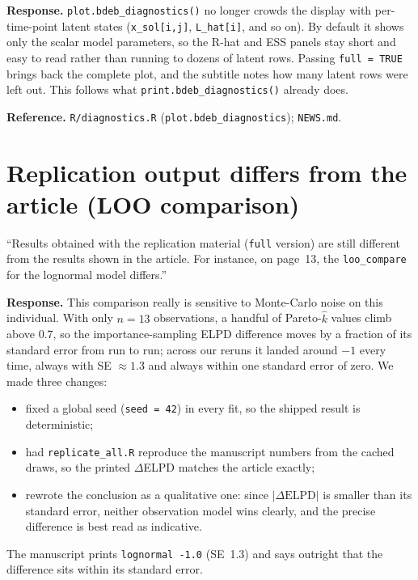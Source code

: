 \documentclass[11pt,a4paper]{article}
\newcommand{\code}[1]{\texttt{#1}}
\begin{document}
\textbf{Response.} \code{plot.bdeb\_diagnostics()} no longer crowds the
display with per-time-point latent states (\code{x\_sol[i,j]},
\code{L\_hat[i]}, and so on). By default it shows only the scalar model
parameters, so the R-hat and ESS panels stay short and easy to read
rather than running to dozens of latent rows. Passing \code{full = TRUE}
brings back the complete plot, and the subtitle notes how many latent
rows were left out. This follows what \code{print.bdeb\_diagnostics()}
already does.

\textbf{Reference.} \code{R/diagnostics.R}
(\code{plot.bdeb\_diagnostics}); \code{NEWS.md}.

\section{Replication output differs from the article (LOO comparison)}

\begin{displayquote}
``Results obtained with the replication material (\code{full} version)
are still different from the results shown in the article. For instance,
on page~13, the \code{loo\_compare} for the lognormal model differs.''
\end{displayquote}

\textbf{Response.} This comparison really is sensitive to Monte-Carlo
noise on this individual. With only $n = 13$ observations, a handful of
Pareto-$\hat{k}$ values climb above $0.7$, so the importance-sampling
ELPD difference moves by a fraction of its standard error from run to
run; across our reruns it landed around $-1$ every time, always with SE
$\approx 1.3$ and always within one standard error of zero. We made
three changes:
\begin{itemize}[nosep]
\item fixed a global seed (\code{seed = 42}) in every fit, so the shipped
  result is deterministic;
\item had \code{replicate\_all.R} reproduce the manuscript numbers from
  the cached draws, so the printed $\Delta$ELPD matches the article
  exactly;
\item rewrote the conclusion as a qualitative one: since
  $|\Delta\mathrm{ELPD}|$ is smaller than its standard error, neither
  observation model wins clearly, and the precise difference is best read
  as indicative.
\end{itemize}
The manuscript prints \code{lognormal -1.0} (SE~1.3) and says outright
that the difference sits within its standard error.
\end{document}
